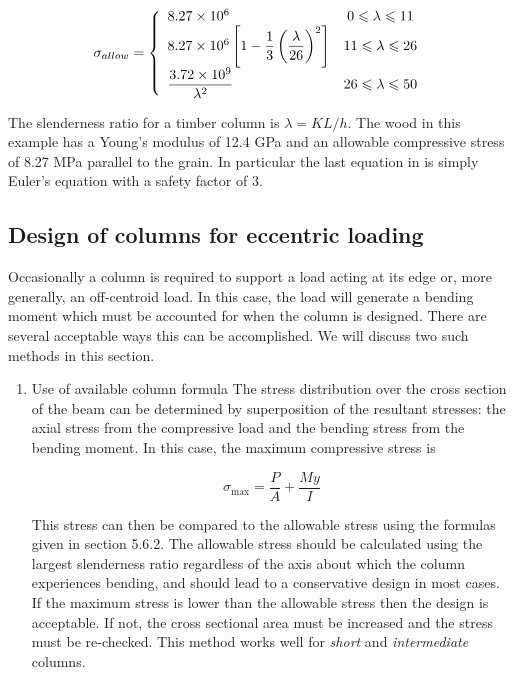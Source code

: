 \documentclass[a4paper,openany,12pt]{book}
\begin{document}
{{\begin{enumerate}
$$\sigma_{allow} = \left\{
    \begin{array}{l c}
      8.27 \times 10^6 & 0 \leqslant \lambda \leqslant 11 \\ 
      8.27 \times 10^6\left[ 1 - \dfrac{1}{3} \left( \dfrac{\lambda}{26} \right)^2 \right] & 11 \leqslant \lambda \leqslant 26 \\ 
      \dfrac{3.72 \times 10^9}{\lambda^2} & 26 \leqslant \lambda \leqslant 50 
    \end{array} \right.$$

The slenderness ratio for a timber column is \(\lambda = KL/h\). The wood
in this example has a Young's modulus of 12.4 GPa and an allowable
compressive stress of 8.27 MPa parallel to the grain. In particular the
last equation in is simply Euler's equation with a safety factor of 3.
\end{enumerate}


\subsection{Design of columns for eccentric loading}
\label{design-of-columns-for-eccentric-loading}
Occasionally a column is required to support a load acting at its edge
or, more generally, an off-centroid load. In this case, the load will
generate a bending moment which must be accounted for when the column is
designed. There are several acceptable ways this can be accomplished. We
will discuss two such methods in this section.


\begin{enumerate}
\item Use of available column formula
\label{use-of-available-column-formula}
The stress distribution over the cross section of the beam can be
determined by superposition of the resultant stresses: the axial stress
from the compressive load and the bending stress from the bending
moment. In this case, the maximum compressive stress is

$${\sigma_{\max}} = \frac{P}{A} + \frac{{My}}{I}$$

This stress can then be compared to the allowable stress using the
formulas given in section 5.6.2. The allowable stress should be
calculated using the largest slenderness ratio regardless of the axis
about which the column experiences bending, and should lead to a
conservative design in most cases. If the maximum stress is lower than
the allowable stress then the design is acceptable. If not, the cross
sectional area must be increased and the stress must be re-checked. This
method works well for \emph{short} and \emph{intermediate} columns.


\end{enumerate}}}
\end{document}
